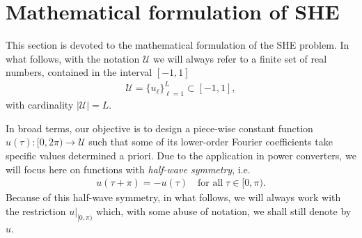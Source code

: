 \section{Mathematical formulation of SHE}\label{sec:GeneralSHEproblem}

This section is devoted to the mathematical formulation of the SHE problem. In what follows, with the notation $\mathcal U$ we will always refer to a finite set of real numbers, contained in the interval $[-1,1]$
\begin{align}\label{eq:Udef}
	\mathcal U = \{u_\ell\}_{\ell=1}^L\subset [-1,1],
\end{align}
with cardinality $|\mathcal U| = L$. 

In broad terms, our objective is to design a piece-wise constant function $u(\tau):[0,2\pi)\to\mathcal U$ such that some of its lower-order Fourier coefficients take specific values determined a priori. 
Due to the application in power converters, we will focus here on functions with \textit{half-wave symmetry}, i.e. 
\begin{align*}
	u(\tau + \pi) = -u(\tau)\quad \mbox{for all}\; \tau \in [0,\pi).
\end{align*}
Because of this half-wave symmetry, in what follows, we will always work with the restriction $u|_{[0,\pi)}$ which, with some abuse of notation, we shall still denote by $u$. 


